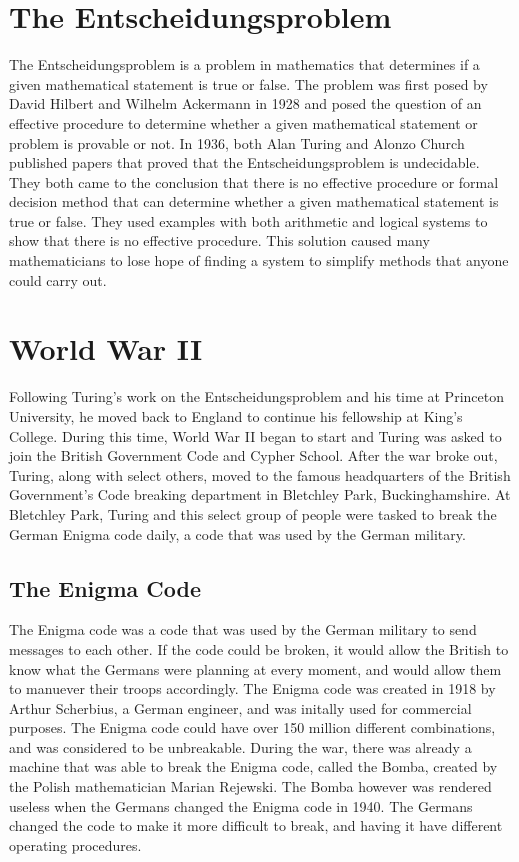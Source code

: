 \documentclass[12pt]{article}
\begin{document}
\section*{The Entscheidungsproblem}
The Entscheidungsproblem is a problem in mathematics that determines if a given mathematical statement
is true or false. The problem was first posed by David Hilbert and Wilhelm Ackermann in 1928
and posed the question of an effective procedure to determine whether a given mathematical statement or 
problem is provable or not. In 1936, both Alan Turing and Alonzo Church published papers
that proved that the Entscheidungsproblem is undecidable.
They both came to the conclusion that there is no effective procedure or formal 
decision method that can determine whether a given mathematical statement is true or false.
They used examples with both arithmetic and logical systems to show that there is no effective procedure.
This solution caused many mathematicians to lose hope of finding a system 
to simplify methods that anyone could carry out.

\section*{World War II}
Following Turing's work on the Entscheidungsproblem and his time at Princeton University,
he moved back to England to continue his fellowship at King's College.
During this time, World War II began to start and Turing was asked to join the British Government Code and Cypher School.
After the war broke out, Turing, along with select others, moved to the famous headquarters of the British Government's
Code breaking department in Bletchley Park, Buckinghamshire. 
At Bletchley Park, Turing and this select group of people were tasked 
to break the German Enigma code daily, a code that was used by the German military.

\subsection*{The Enigma Code}
The Enigma code was a code that was used by the German military to send messages to each other.
If the code could be broken, it would allow the British to know what the Germans were planning at every
moment, and would allow them to manuever their troops accordingly.
The Enigma code was created in 1918 by Arthur Scherbius, a German engineer, and was initally used for 
commercial purposes. The Enigma code could have over 150 million different combinations, and was
considered to be unbreakable. During the war, there was already a machine that was able to break the Enigma code,
called the Bomba, created by the Polish mathematician Marian Rejewski. The Bomba however was rendered useless
when the Germans changed the Enigma code in 1940. The Germans changed the code to make it more difficult to break,
and having it have different operating procedures. 
\end{document}
